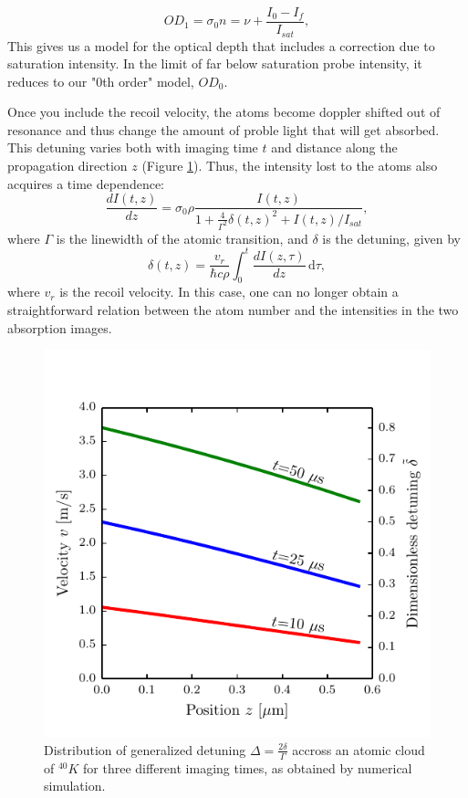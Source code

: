 \documentclass[12pt]{iopart}
\begin{document}
\begin{equation} 
OD_1 =\sigma_0 n = \nu + \frac{I_0-I_f}{I_{sat}},
\label{eq2}
\end{equation}
 This gives us a model for the optical depth that includes a correction due to saturation intensity. In the limit of far below saturation probe intensity, it reduces to our "0th order" model, $OD_0$. 
\par Once you include the recoil velocity, the atoms become doppler shifted out of resonance and thus change the amount of proble light that will get absorbed. This detuning varies both with imaging time $t$ and distance along the propagation direction $z$ (Figure \ref{fig:detunedBlobs}). Thus, the intensity lost to the atoms also acquires a time dependence: 
\begin{equation}
\frac{dI(t,z)}{dz}=\sigma_0 \rho \frac{I(t,z)}{1+\frac{4}{\Gamma^2}\delta(t,z)^2 +I(t,z)/I_{sat}}, \label{eq3}
\end{equation}
where $\Gamma$ is the linewidth of the atomic transition, and $\delta$ is the detuning, given by 
\begin{equation}
\delta(t,z)=\frac{v_r}{\hbar c \rho}\int_0^t \frac{dI(z,\tau)}{dz}\,\mathrm{d}\tau, \label{eq4} 
\end{equation}
where  $v_r$ is the recoil velocity. In this case, one can no longer obtain a straightforward relation between the atom number and the intensities in the two absorption images.
\begin{figure}
	\includegraphics*[scale=0.57]{figure1}
\caption{Distribution of generalized detuning $\Delta=\frac{2\delta}{\Gamma}$ accross an atomic cloud of $^{40}K$ for three different imaging times, as obtained by numerical simulation.}  
\label{fig:detunedBlobs}
\end{figure}
\end{document}
